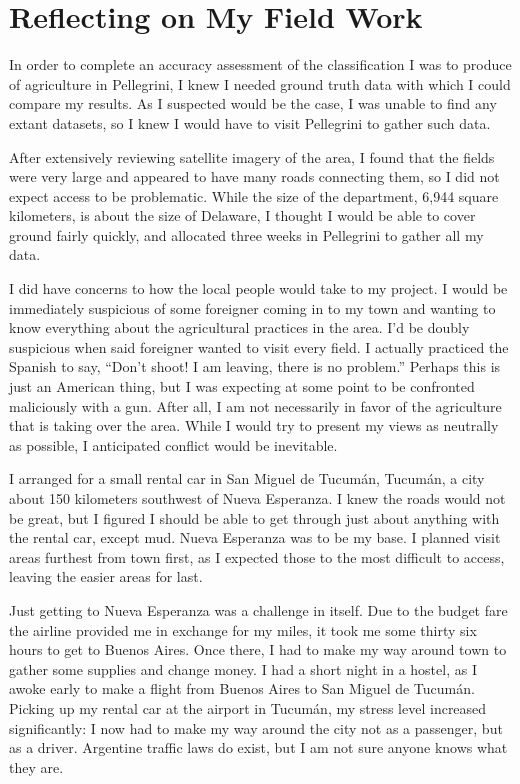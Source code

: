 \chapter{Reflecting on My Field Work}
\label{appendix:fieldwork}

In order to complete an accuracy assessment of the classification I was to produce of agriculture in Pellegrini, I knew I needed ground truth data with which I could compare my results. As I suspected would be the case, I was unable to find any extant datasets, so I knew I would have to visit Pellegrini to gather such data.

After extensively reviewing satellite imagery of the area, I found that the fields were very large and appeared to have many roads connecting them, so I did not expect access to be problematic. While the size of the department, 6,944 square kilometers, is about the size of Delaware, I thought I would be able to cover ground fairly quickly, and allocated three weeks in Pellegrini to gather all my data.

I did have concerns to how the local people would take to my project. I would be immediately suspicious of some foreigner coming in to my town and wanting to know everything about the agricultural practices in the area. I'd be doubly suspicious when said foreigner wanted to visit every field. I actually practiced the Spanish to say, ``Don’t shoot! I am leaving, there is no problem.'' Perhaps this is just an American thing, but I was expecting at some point to be confronted maliciously with a gun. After all, I am not necessarily in favor of the agriculture that is taking over the area. While I would try to present my views as neutrally as possible, I anticipated conflict would be inevitable.

I arranged for a small rental car in San Miguel de Tucumán, Tucumán, a city about 150 kilometers southwest of Nueva Esperanza. I knew the roads would not be great, but I figured I should be able to get through just about anything with the rental car, except mud. Nueva Esperanza was to be my base. I planned visit areas furthest from town first, as I expected those to the most difficult to access, leaving the easier areas for last.

Just getting to Nueva Esperanza was a challenge in itself. Due to the budget fare the airline provided me in exchange for my miles, it took me some thirty six hours to get to Buenos Aires. Once there, I had to make my way around town to gather some supplies and change money. I had a short night in a hostel, as I awoke early to make a flight from Buenos Aires to San Miguel de Tucumán. Picking up my rental car at the airport in Tucumán, my stress level increased significantly: I now had to make my way around the city not as a passenger, but as a driver. Argentine traffic laws do exist, but I am not sure anyone knows what they are.


